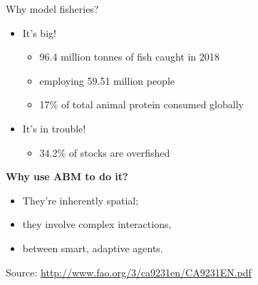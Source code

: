\documentclass[table, 14pt, aspectratio=169]{beamer}
\newcommand{\hl}[1]{\textcolor{OxfordBlue}{\textbf{#1}}}
\begin{document}
\begin{frame}{Why model fisheries?}
    
  \begin{itemize}
    \item It's big!
      \begin{itemize}
        \item 96.4 million tonnes of fish caught in 2018
        \item employing 59.51 million people
        \item 17\% of total animal protein consumed globally
      \end{itemize}
    \vfill
    \item It's in trouble!
      \begin{itemize}
        \item 34.2\% of stocks are overfished
      \end{itemize}
  \end{itemize}
  \vfill
  \hl{Why use ABM to do it?}
  \begin{itemize}
    \item They're inherently spatial;
    \item they involve complex interactions,
    \item between smart, adaptive agents.
  \end{itemize}
  \vfill
  \tiny Source: \url{http://www.fao.org/3/ca9231en/CA9231EN.pdf}
\end{frame}
\end{document}
